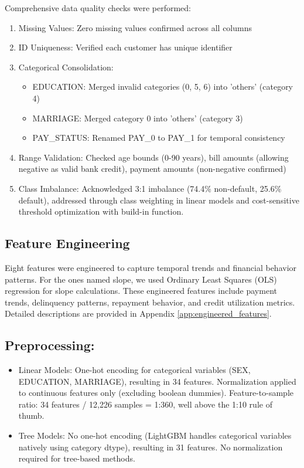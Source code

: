 \documentclass[12pt]{article}
\begin{document}
Comprehensive data quality checks were performed:

\begin{enumerate}[label=\alph*.]
    \item Missing Values: Zero missing values confirmed across all columns
    \item ID Uniqueness: Verified each customer has unique identifier
    \item Categorical Consolidation:
    \begin{itemize}[label=-]
        \item EDUCATION: Merged invalid categories (0, 5, 6) into 'others' (category 4)
        \item MARRIAGE: Merged category 0 into 'others' (category 3)
        \item PAY\_STATUS: Renamed PAY\_0 to PAY\_1 for temporal consistency
    \end{itemize}
    \item Range Validation: Checked age bounds (0-90 years), bill amounts (allowing negative as valid bank credit), payment amounts (non-negative confirmed)
    \item Class Imbalance: Acknowledged 3:1 imbalance (74.4\% non-default, 25.6\% default), addressed through class weighting in linear models and cost-sensitive threshold optimization with build-in function.
\end{enumerate}

\subsection{Feature Engineering}

Eight features were engineered to capture temporal trends and financial behavior patterns. For the ones named slope, we used Ordinary Least Squares (OLS) regression for slope calculations. These engineered features include payment trends, delinquency patterns, repayment behavior, and credit utilization metrics. Detailed descriptions are provided in Appendix \ref{app:engineered_features}.

\subsection{Preprocessing:}
\begin{itemize}
    \item Linear Models: One-hot encoding for categorical variables (SEX, EDUCATION, MARRIAGE), resulting in 34 features. Normalization applied to continuous features only (excluding boolean dummies). Feature-to-sample ratio: 34 features / 12,226 samples = 1:360, well above the 1:10 rule of thumb.
    \item Tree Models: No one-hot encoding (LightGBM handles categorical variables natively using category dtype), resulting in 31 features. No normalization required for tree-based methods.
\end{itemize}
\end{document}
